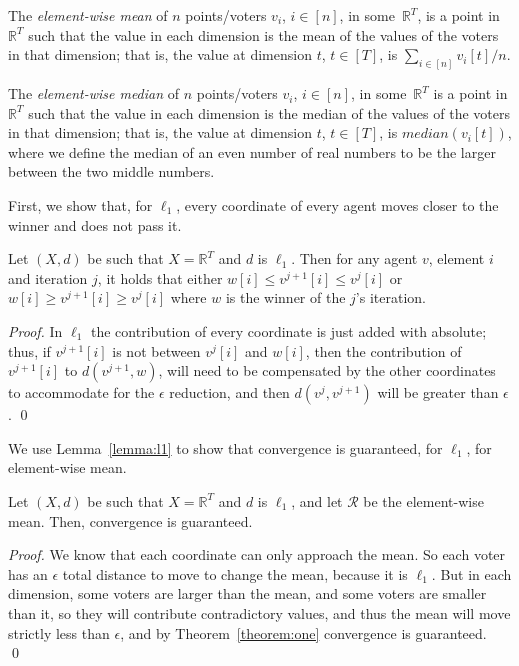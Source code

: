 \documentclass[runningheads,envcountsame]{llncs}
\begin{document}
\begin{definition}
    The \emph{element-wise mean} of $n$ points/voters $v_i$, $i \in [n]$, in some~$\mathbb{R}^T$, is a point in $\mathbb{R}^T$ such that the value in each dimension is the mean of the values of the voters in that dimension; that is, the value at dimension $t$, $t \in [T]$, is $\sum_{i \in [n]} v_i[t] /n$.
\end{definition}

\begin{definition}
    The \emph{element-wise median} of $n$ points/voters $v_i$, $i \in [n]$, in some~$\mathbb{R}^T$ is a point in $\mathbb{R}^T$ such that the value in each dimension is the median of the values of the voters in that dimension; that is, the value at dimension $t$, $t \in [T]$, is $median(v_i[t])$, where we define the median of an even number of real numbers to be the larger between the two middle numbers.
\end{definition}

First, we show that, for $\ell_1$, every coordinate of every agent moves closer to the winner and does not pass it.

\begin{lemma}\label{lemma:l1}
  Let $(X, d)$ be such that $X = \mathbb{R}^T$ and $d$ is $\ell_1$. Then for any agent $v$, element $i$ and iteration $j$, it holds that either $w[i] \leq v^{j+1}[i] \leq v^{j}[i]$ or $w[i] \geq v^{j+1}[i] \geq v^{j}[i]$ where $w$ is the winner of the $j$'s iteration.
\end{lemma}

\begin{proof}
  In $\ell_1$ the contribution of every coordinate is just added with absolute; thus, if $v^{j+1}[i]$ is not between $v^{j}[i]$ and $w[i]$, then the contribution of $v^{j+1}[i]$ to $d(v^{j+1}, w)$, will need to be compensated by the other coordinates to accommodate for the $\epsilon$ reduction, and then $d(v^{j}, v^{j+1})$ will be greater than $\epsilon$.
\qed\end{proof}

We use Lemma~\ref{lemma:l1} to show that convergence is guaranteed, for $\ell_1$, for element-wise mean.

\begin{theorem}\label{theorem:mean_l1}
  Let $(X, d)$ be such that $X = \mathbb{R}^T$ and $d$ is $\ell_1$, and let $\mathcal{R}$ be the element-wise mean. Then, convergence is guaranteed.
\end{theorem}

\begin{proof}
  We know that each coordinate can only approach the mean. So each voter has an $\epsilon$ total distance to move to change the mean, because it is $\ell_1$. But in each dimension, some voters are larger than the mean, and some voters are smaller than it, so they will contribute contradictory values, and thus the mean will move strictly less than $\epsilon$, and by Theorem~\ref{theorem:one} convergence is guaranteed.
\qed\end{proof}
\end{document}
